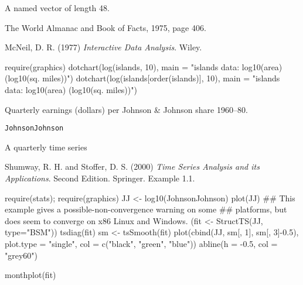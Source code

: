 %
\begin{Format}
A named vector of length 48.
\end{Format}
%
\begin{Source}\relax
The World Almanac and Book of Facts, 1975, page 406.
\end{Source}
%
\begin{References}\relax
McNeil, D. R. (1977)
\emph{Interactive Data Analysis}.
Wiley.
\end{References}
%
\begin{Examples}
\begin{ExampleCode}
require(graphics)
dotchart(log(islands, 10),
   main = "islands data: log10(area) (log10(sq. miles))")
dotchart(log(islands[order(islands)], 10),
   main = "islands data: log10(area) (log10(sq. miles))")
\end{ExampleCode}
\end{Examples}
%
\begin{Description}\relax
Quarterly earnings (dollars) per Johnson \& Johnson share 1960--80.
\end{Description}
%
\begin{Usage}
\begin{verbatim}
JohnsonJohnson
\end{verbatim}
\end{Usage}
%
\begin{Format}
A quarterly time series
\end{Format}
%
\begin{Source}\relax
Shumway, R. H. and Stoffer, D. S. (2000)
\emph{Time Series Analysis and its Applications}.
Second Edition.  Springer.  Example 1.1.
\end{Source}
%
\begin{Examples}
\begin{ExampleCode}

require(stats); require(graphics)
JJ <- log10(JohnsonJohnson)
plot(JJ)
## This example gives a possible-non-convergence warning on some
## platforms, but does seem to converge on x86 Linux and Windows.
(fit <- StructTS(JJ, type="BSM"))
tsdiag(fit)
sm <- tsSmooth(fit)
plot(cbind(JJ, sm[, 1], sm[, 3]-0.5), plot.type = "single",
     col = c("black", "green", "blue"))
abline(h = -0.5, col = "grey60")

monthplot(fit)
\end{ExampleCode}
\end{Examples}
